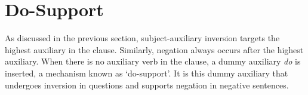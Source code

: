 
\section{Do-Support}

As discussed in the previous section, subject-auxiliary inversion targets the
highest auxiliary in the clause. Similarly, negation always occurs after the
highest auxiliary. When there is no auxiliary verb in the clause, a dummy
auxiliary {\it do} is inserted, a mechanism known as `do-support'. It is this
dummy auxiliary that undergoes inversion in questions and supports negation in
negative sentences. 





